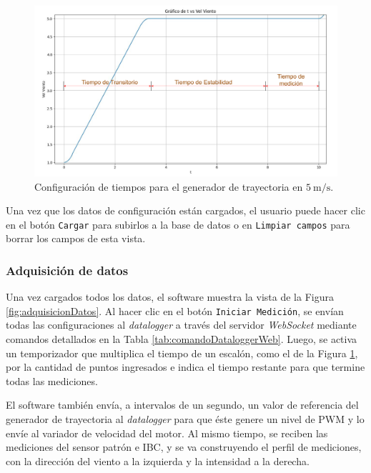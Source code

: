\begin{figure}[H]
    \centering
    \includegraphics[width=0.9\linewidth]{Figuras/AplicacionWeb/frondend/curvaEscalon.png}
    \caption{Configuración de tiempos para el generador de trayectoria en $\SI{5}{\meter\per\second}$.}
    \label{fig:curvaEscalon}
\end{figure}

Una vez que los datos de configuración están cargados, el usuario puede hacer clic en el botón \texttt{Cargar} para subirlos a la base de datos o en \texttt{Limpiar campos} para borrar los campos de esta vista.


\subsubsection{Adquisición de datos}\label{sec:adquisicionDatos}

Una vez cargados todos los datos, el software muestra la vista de la Figura \ref{fig:adquisicionDatos}. Al hacer clic en el botón \texttt{Iniciar Medición}, se envían todas las configuraciones al \textit{datalogger} a través del servidor \textit{WebSocket} mediante comandos detallados en la Tabla \ref{tab:comandoDataloggerWeb}. Luego, se activa un temporizador que multiplica el tiempo de un escalón, como el de la Figura \ref{fig:curvaEscalon}, por la cantidad de puntos ingresados e indica el tiempo restante para que termine todas las mediciones. 

El software también envía, a intervalos de un segundo, un valor de referencia del generador de trayectoria al \textit{datalogger} para que éste genere un nivel de PWM y lo envíe al variador de velocidad del motor. Al mismo tiempo, se reciben las mediciones del sensor patrón e IBC, y se va construyendo el perfil de mediciones, con la dirección del viento a la izquierda y la intensidad a la derecha.

